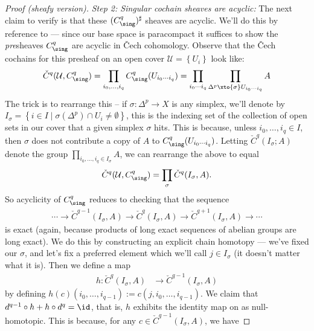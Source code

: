 \documentclass[11pt]{book}
\begin{document}
\begin{proof}[Proof (sheafy version)]
\emph{Step 2: Singular cochain sheaves are acyclic:} The next claim to verify is that these $(C^q_\sing)^\sharp$ sheaves are acyclic. We'll do this by reference to  --- since our base space is paracompact it suffices to show the \emph{pre}sheaves $C^q_\sing$ are acyclic in \v{C}ech cohomology. Observe that the \v{C}ech cochains for this presheaf on an open cover $\mathcal{U} = \left\{ U_i \right\}$ look like:
\begin{align*}
    \check{C}^q (\mathcal{U}, C^q_\sing) = \prod_{i_0, \ldots, i_q} C^q_\sing(U_{i_0 \cdots i_q}) = \prod_{i_0 \cdots i_q} \prod_{\Delta^p \xto{\sigma} U_{i_0 \cdots i_q}}A
\end{align*}
The trick is to rearrange this -- if $\sigma \colon \Delta^p \to X$ is any simplex, we'll denote by $I_\sigma = \left\{ i\in I \mid \sigma(\Delta^p) \cap U_i \ne \emptyset \right\}$, this is the indexing set of the collection of open sets in our cover that a given simplex $\sigma$ hits. This is because, unless $i_0, \ldots, i_q\in I$, then $\sigma$ does not contribute a copy of $A$ to $C^q_\sing(U_{i_0 \cdots i_q})$. Letting $\check{C}^q(I_\sigma;A)$ denote the group $\prod_{i_0, \ldots, i_q \in I_\sigma} A$, we can rearrange the above to equal
\begin{align*}
    \check{C}^q(\mathcal{U},C^q_\sing) = \prod_{\sigma} \check{C}^q(I_\sigma,A).
\end{align*}
So acyclicity of $C^q_\sing$ reduces to checking that the sequence
\begin{equation}\label{eqn:Isigma-LES}
\begin{aligned}
    \cdots \to\check{C}^{q-1}(I_\sigma, A) \to \check{C}^q(I_\sigma,A) \to \check{C}^{q+1}(I_\sigma,A) \to \cdots
\end{aligned}
\end{equation}
is exact (again, because products of long exact sequences of abelian groups are long exact). We do this by constructing an explicit chain homotopy --- we've fixed our $\sigma$, and let's fix a preferred element which we'll call $j \in I_\sigma$ (it doesn't matter what it is). Then we define a map
\begin{align*}
    h \colon \check{C}^q (I_\sigma,A) &\to \check{C}^{q-1}(I_\sigma,A)
\end{align*}
by defining $h(c)(i_0, \ldots, i_{q-1}) := c(j,i_0, \ldots, i_{q-1})$. We claim that $d^{q-1}\circ h + h\circ d^{q} = \id$, that is, $h$ exhibits the identity map on  as null-homotopic. This is because, for any $c \in \check{C}^{q-1}(I_\sigma,A)$, we have

\end{proof}
\end{document}
